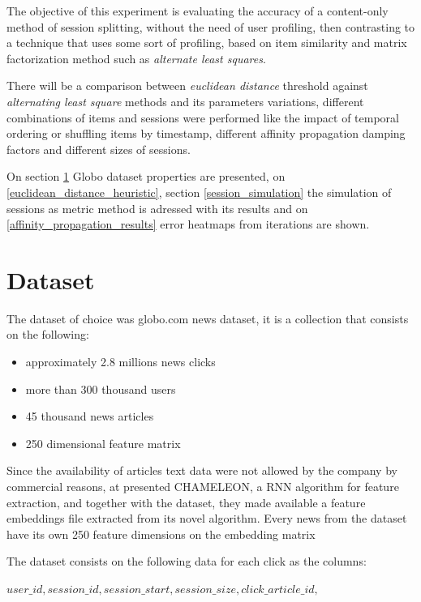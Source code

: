 \documentclass[ecp,tc,english]{iiufrgs}
\begin{document}
    
    The objective of this experiment is evaluating the accuracy of a content-only method of session splitting, without the need of user profiling, then contrasting to a technique that uses some sort of profiling, based on item similarity and matrix factorization method such as \textit{alternate least squares}.
    
    There will be a comparison between \textit{euclidean distance} threshold against \textit{alternating least square} methods and its parameters variations, different combinations of items and sessions were performed like the impact of temporal ordering or shuffling items by timestamp, different affinity propagation damping factors and different sizes of sessions.
    
    On section \ref{globo_dot_com_dataset} Globo dataset properties are presented, on \ref{euclidean_distance_heuristic}, section \ref{session_simulation} the simulation of sessions as metric method is adressed with its results and on \ref{affinity_propagation_results} error heatmaps from iterations are shown.

    \section{Dataset} \label{globo_dot_com_dataset}
    The dataset of choice was globo.com news dataset, it is a collection that consists on the following:
    \begin{itemize}
        \item approximately 2.8 millions news clicks
        \item more than 300 thousand users
        \item 45 thousand news articles
        \item 250 dimensional feature matrix
    \end{itemize}
    
    Since the availability of articles text data were not allowed by the company by commercial reasons, at \cite{moreira2018chameleon} presented CHAMELEON, a RNN algorithm for feature extraction, and together with the dataset, they made available a feature embeddings file extracted from its novel algorithm. Every news from the dataset have its own 250 feature dimensions on the embedding matrix
    
    The dataset consists on the following data for each click as the columns:
    
    \(user\_id, session\_id, session\_start, session\_size, click\_article\_id,\) 
    
\end{document}
